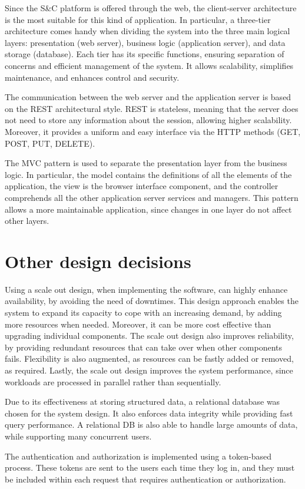 Since the S\&C platform is offered through the web, the client-server architecture is the most suitable for this kind of application.
In particular, a three-tier architecture comes handy when dividing the system into the three main logical layers: presentation (web server), business logic (application server), and data storage (database).
Each tier has its specific functions, ensuring separation of concerns and efficient management of the system.
It allows scalability, simplifies maintenance, and enhances control and security.

The communication between the web server and the application server is based on the REST architectural style.
REST is stateless, meaning that the server does not need to store any information about the session, allowing higher scalability.
Moreover, it provides a uniform and easy interface via the HTTP methods (GET, POST, PUT, DELETE).

The MVC pattern is used to separate the presentation layer from the business logic.
In particular, the model contains the definitions of all the elements of the application, the view is the browser interface component, and the controller comprehends all the other application server services and managers.
This pattern allows a more maintainable application, since changes in one layer do not affect other layers.

\section{Other design decisions}

Using a scale out design, when implementing the software, can highly enhance availability, by avoiding the need of downtimes.
This design approach enables the system to expand its capacity to cope with an increasing demand, by adding more resources when needed.
Moreover, it can be more cost effective than upgrading individual components.
The scale out design also improves reliability, by providing redundant resources that can take over when other components fails.
Flexibility is also augmented, as resources can be fastly added or removed, as required.
Lastly, the scale out design improves the system performance, since workloads are processed in parallel rather than sequentially.

Due to its effectiveness at storing structured data, a relational database was chosen for the system design.
It also enforces data integrity while providing fast query performance.
A relational DB is also able to handle large amounts of data, while supporting many concurrent users.

The authentication and authorization is implemented using a token-based process.
These tokens are sent to the users each time they log in, and they must be included within each request that requires authentication or authorization.

